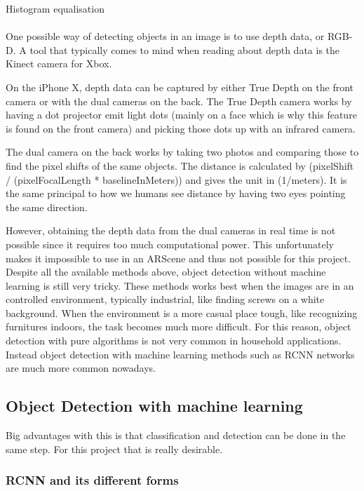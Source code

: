 Histogram equalisation
\\\\
One possible way of detecting objects in an image is to use depth data, or RGB-D.
A tool that typically comes to mind when reading about depth data is the Kinect camera
for Xbox.

On the iPhone X, depth data can be captured by either True Depth on the front camera or with the dual cameras on the back. The True Depth camera works by having a dot projector emit light dots (mainly on a face which is why this feature is found on the front camera) and picking those dots up with an infrared camera.

The dual camera on the back works by taking two photos and comparing those to find the pixel shifts of the same objects. The distance is calculated by (pixelShift / (pixelFocalLength * baselineInMeters)) and gives the unit in (1/meters). It is the same principal to how we humans see distance by having two eyes pointing the same direction. \cite{depthMap}

However, obtaining the depth data from the dual cameras in real time is not possible since it requires too much computational power. This unfortunately makes it impossible to use in an ARScene and thus not possible for this project.\\

Despite all the available methods above, object detection without machine learning is still very tricky. These methods works best when the images are in an controlled environment, typically industrial, like finding screws on a white background.
When the environment is a more casual place tough, like recognizing furnitures indoors, the task becomes much more difficult. For this reason, object detection with pure algorithms is not very common in household applications. Instead object detection with machine learning methods such as RCNN networks are much more common nowadays.

\subsection{Object Detection with machine learning}

Big advantages with this is that classification and detection can be done in the same
 step. For this project that is really desirable.

\subsubsection{RCNN and its different forms}

